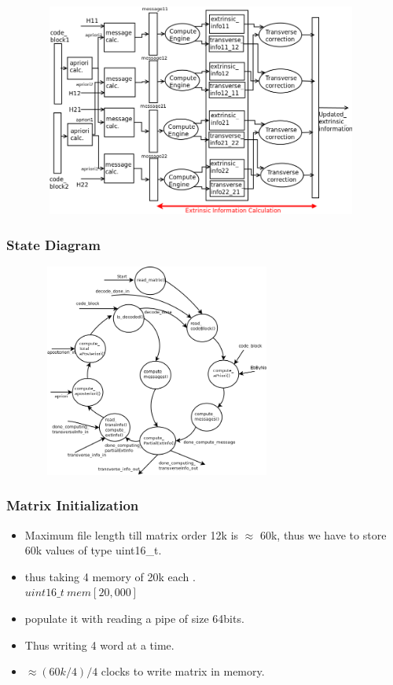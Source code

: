 \documentclass[xcolor=dvipsname]
{beamer}
\begin{document}
\begin{frame}[t]
\frametitle{  }  
\begin{figure}
       \includegraphics[height=7cm,width=11cm]{minSumModified}
       \end{figure}
\end{frame}

\begin{frame}[t]
\frametitle{ State Diagram }  
\begin{figure}
       \includegraphics[height=7cm,width=8cm]{stateDiagram}
       \end{figure}
\end{frame}


\begin{frame}[t]
\frametitle{ Matrix Initialization }  
\begin{itemize}
\item Maximum file length till matrix order 12k is $\approx$ 60k, thus we have to store 60k values of type uint16\_t.
\item thus taking 4 memory of 20k each .\\
 $uint16\_t \ mem[20,000]$
\item populate it with reading a pipe of size 64bits.
\item Thus writing 4 word at a time.
\item $\approx (60k/4)/4 $ clocks to write matrix in memory.
\end{itemize}
\end{frame}
\end{document}
